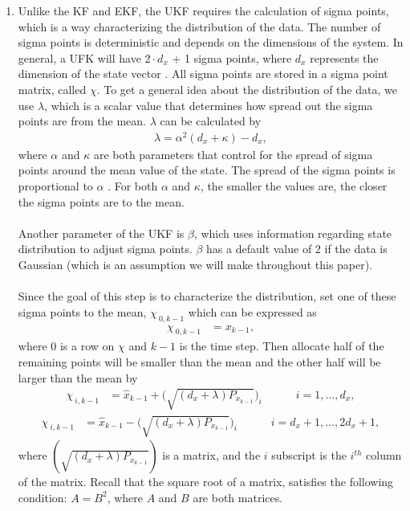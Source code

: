 \begin{enumerate}
        \item Unlike the KF and EKF, the UKF requires the calculation of sigma points, which is a way characterizing the distribution of the data. The number of sigma points is deterministic and depends on the dimensions of the system. In general, a UFK will have  $2 \cdot d_x$ + 1 sigma points, where $d_x$ represents the dimension of the state vector \cite{inbook, inproceedings, Wan01theunscented}.  All sigma points are stored in a sigma point matrix, called $\chi$. To get a general idea about the distribution of the data, we use $\lambda$, which is a scalar value that determines how spread out the sigma points are from the mean. $\lambda$ can be calculated by
         \begin{align*}
        \lambda = \alpha^{2}(d_{x}+\kappa)-d_{x},
         \end{align*}
         where  $\alpha$ and $\kappa$ are both parameters that control for the spread of sigma points around the mean value of the state. The spread of the sigma points is proportional to $\alpha$ . For both $\alpha$ and $\kappa $,  the smaller the values are, the closer the sigma points are to the mean.\\ \\
       Another parameter of the UKF is $\beta$, which uses information regarding state distribution to adjust sigma points. $\beta$ has a default value of 2 if the data is Gaussian (which is an assumption we will make throughout this paper).  \\ \\
       Since the goal of this step is to characterize the distribution, set one of these sigma points to the mean, $\chi_{\ 0,k-1}$ which can be expressed as 
    \begin{align*}
        \chi_{\ 0,k-1} &= x_{k-1} ,
     \end{align*}
     where 0 is a row on $\chi$ and $k-1$ is the time step. Then allocate half of the remaining points will be smaller than the mean and the other half will be larger than the mean by
         \begin{align*}
        \chi_{\ i,k-1} &= \hat{x}_{k-1} +  \bigg(\sqrt{(d_{x}+\lambda )P_{x_{k-1}}}\bigg)_{i} \quad \quad \quad i=1,\dots, d_x, 
        \end{align*}
         \begin{align*}
        \chi_{\ i,k-1} &= \hat{x}_{k-1} - \bigg(\sqrt{(d_{x}+\lambda )P_{x_{k-1}}}\bigg)_{i} \quad \quad \quad i=d_x + 1,\dots,2 d_x + 1,
        \end{align*}
        where $(\sqrt{(d_{x}+\lambda)P_{x_{k-1}}})$ is a matrix, and the $i$ subscript is the $i^{th}$ column of the matrix. 
        Recall that the square root of a matrix, satisfies the following condition: $A = B^2$, where $A$ and $B$ are both matrices. 
        

\end{enumerate}
